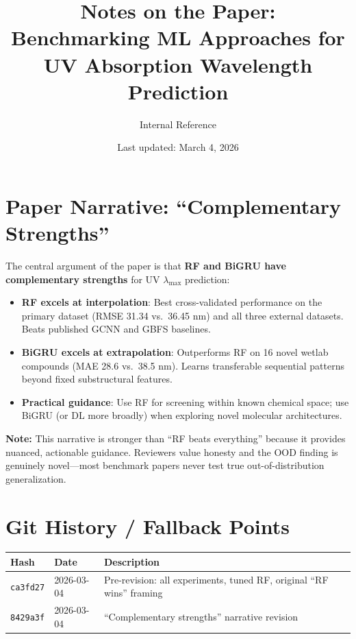 \documentclass[11pt,a4paper]{article}
\title{Notes on the Paper:\\
\large Benchmarking ML Approaches for UV Absorption Wavelength Prediction}
\author{Internal Reference}
\date{Last updated: March 4, 2026}
\newcommand{\NOTE}[1]{\textcolor{info}{\textbf{Note:} #1}}
\begin{document}
\maketitle
\tableofcontents
\newpage

\section{Paper Narrative: ``Complementary Strengths''}

The central argument of the paper is that \textbf{RF and BiGRU have complementary strengths} for UV $\lambda_{\max}$ prediction:

\begin{itemize}
    \item \textbf{RF excels at interpolation}: Best cross-validated performance on the primary dataset (RMSE 31.34 vs.\ 36.45 nm) and all three external datasets. Beats published GCNN and GBFS baselines.
    \item \textbf{BiGRU excels at extrapolation}: Outperforms RF on 16 novel wetlab compounds (MAE 28.6 vs.\ 38.5 nm). Learns transferable sequential patterns beyond fixed substructural features.
    \item \textbf{Practical guidance}: Use RF for screening within known chemical space; use BiGRU (or DL more broadly) when exploring novel molecular architectures.
\end{itemize}

\NOTE{This narrative is stronger than ``RF beats everything'' because it provides nuanced, actionable guidance. Reviewers value honesty and the OOD finding is genuinely novel---most benchmark papers never test true out-of-distribution generalization.}


\section{Git History / Fallback Points}

\begin{tabular}{lll}
\toprule
\textbf{Hash} & \textbf{Date} & \textbf{Description} \\
\midrule
\texttt{ca3fd27} & 2026-03-04 & Pre-revision: all experiments, tuned RF, original ``RF wins'' framing \\
\texttt{8429a3f} & 2026-03-04 & ``Complementary strengths'' narrative revision \\
\bottomrule
\end{tabular}
\end{document}
